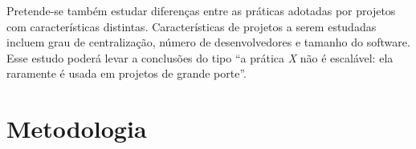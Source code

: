 \documentclass{article}
\begin{document}
Pretende-se também estudar diferenças entre as práticas adotadas por projetos
com características distintas. Características de projetos a serem estudadas
incluem grau de centralização, número de desenvolvedores e tamanho do software.
Esse estudo poderá levar a conclusões do tipo ``a prática \emph{X} não é
escalável: ela raramente é usada em projetos de grande porte''. 





\section{Metodologia}
\end{document}
